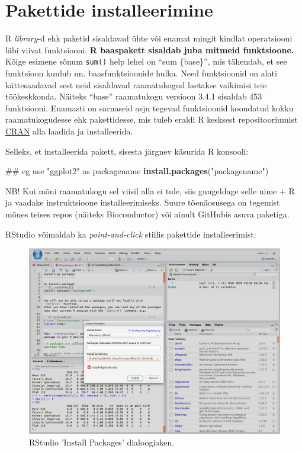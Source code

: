 \documentclass[]{book}
\newenvironment{Shaded}{\begin{snugshade}}{\end{snugshade}}
\newcommand{\KeywordTok}[1]{\textcolor[rgb]{0.13,0.29,0.53}{\textbf{#1}}}
\newcommand{\StringTok}[1]{\textcolor[rgb]{0.31,0.60,0.02}{#1}}
\newcommand{\NormalTok}[1]{#1}
\begin{document}
\section{Pakettide installeerimine}\label{libs}

R \emph{library}-d ehk paketid sisaldavad ühte või enamat mingit kindlat
operatsiooni läbi viivat funktsiooni. \textbf{R baaspakett sisaldab juba
mitmeid funktsioone.} Kõige esimene sõnum \texttt{sum()} help lehel on
``sum \{base\}'', mis tähendab, et see funktsioon kuulub nn.
baasfunktsioonide hulka. Need funktsioonid on alati kättesaadavad sest
neid sisaldavad raamatukogud laetakse vaikimisi teie töökeskkonda.
Näiteks ``base'' raamatukogu versioon 3.4.1 sisaldab 453 funktsiooni.
Enamasti on sarnaseid asju tegevad funktsioonid koondatud kokku
raamatukogudesse ehk pakettidesse, mis tuleb eraldi R kesksest
repositooriumist \href{https://cran.r-project.org}{CRAN} alla laadida ja
installeerida.

Selleks, et installeerida pakett, sisesta järgnev käsurida R konsooli:

\begin{Shaded}
\begin{Highlighting}[]
\NormalTok{## eg use "ggplot2" as packagename}
\KeywordTok{install.packages}\NormalTok{(}\StringTok{"packagename"}\NormalTok{)}
\end{Highlighting}
\end{Shaded}

NB! Kui mõni raamatukogu sel viisil alla ei tule, siis guugeldage selle
nime + R ja vaadake instruktsioone installeerimiseks. Suure tõenäosusega
on tegemist mõnes teises repos (näiteks Bioconductor) või ainult
GitHubis asuva paketiga.

RStudio võimaldab ka \emph{point-and-click} stiilis pakettide
installeerimist:

\begin{figure}
\includegraphics[width=16.85in]{assets/img/RStudio_package.install} \caption{RStudio 'Install Packages' dialoogiaken.}\label{fig:unnamed-chunk-3}
\end{figure}
\end{document}
